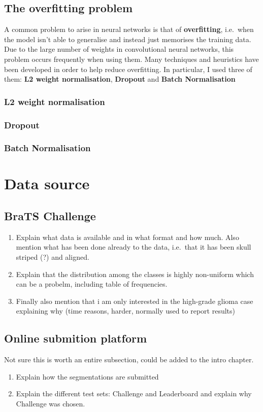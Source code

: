 \documentclass[12pt,a4paper,twoside,openright]{report}
\begin{document}
\subsection{The overfitting problem}
A common problem to arise in neural networks is that of \textbf{overfitting}, i.e.\ when the model isn't able to generalise and instead just memorises the training data. Due to the large number of weights in convolutional neural networks, this problem occurs frequently when using them. Many techniques and heuristics have been developed in order to help reduce overfitting. In particular, I used three of them: \textbf{L2 weight normalisation}, \textbf{Dropout} and \textbf{Batch Normalisation}
\subsubsection{L2 weight normalisation}
\subsubsection{Dropout}
\subsubsection{Batch Normalisation}

\section{Data source}
\subsection{BraTS Challenge}
\begin{enumerate}
	\item Explain what data is available and in what format and how much. Also mention what has been done already to the data, i.e.\ that it has been skull striped (?) and aligned.
	\item Explain that the distribution among the classes is highly non-uniform which can be a probelm, including table of frequencies.
	\item Finally also mention that i am only interested in the high-grade glioma case explaining why (time reasons, harder, normally used to report results)
\end{enumerate}
\subsection{Online submition platform}
Not sure this is worth an entire subsection, could be added to the intro chapter.
\begin{enumerate}
	\item Explain how the segmentations are submitted
	\item Explain the different test sets: Challenge and Leaderboard and explain why Challenge was chosen.
\end{enumerate}
\end{document}
